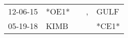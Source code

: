 \begin{supertabular}{p{0.07\textwidth}p{0.06\textwidth}p{0.02\textwidth}p{0.02\textwidth}p{0.06\textwidth}}
 12-06-15\textsuperscript{} &                   *OE1* &   &  , &  GULF\textsuperscript{} \\
 05-19-18\textsuperscript{} &  KIMB\textsuperscript{} &   &    &                   *CE1* \\
\end{supertabular}
